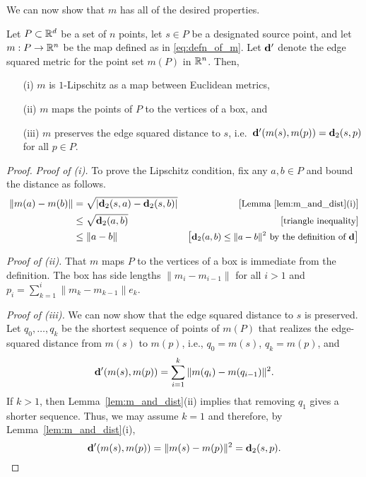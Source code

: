   We can now show that $m$ has all of the desired properties.

  \begin{prop}\label{prop:m_is_good}
    Let $P\subset\mathbb{R}^d$ be a set of $n$ points, let $s\in P$ be a designated source point, and let $m:P\to \mathbb{R}^n$ be the map defined as in \eqref{eq:defn_of_m}.
    Let $\mathbf{d}'$ denote the edge squared metric for the point set $m(P)$ in $\mathbb{R}^n$.
    Then,
    \begin{enumerate}
      \item[(i)] $m$ is $1$-Lipschitz as a map between Euclidean metrics,
      \item[(ii)] $m$ maps the points of $P$ to the vertices of a box, and
      \item[(iii)] $m$ preserves the edge squared distance to $s$, i.e.\ $\mathbf{d}'(m(s), m(p)) = \mathbf{d}_2(s,p)$ for all $p\in P$.
    \end{enumerate} 
  \end{prop}
  \begin{proof}
    \emph{Proof of (i).} To prove the Lipschitz condition, fix any $a,b\in P$ and bound the distance as follows.
    \begin{align*}
      \|m(a) - m(b)\| 
        &= \sqrt{|\mathbf{d}_2(s,a) - \mathbf{d}_2(s,b)|} &\left[\text{\small{Lemma~\ref{lem:m_and_dist}(i)}}\right]\\
        &\le \sqrt{\mathbf{d}_2(a,b)} &\left[\text{\small{triangle inequality}}\right]\\
        &\le \|a-b\| &\left[\text{\small{$\mathbf{d}_2(a,b)\le \|a-b\|^2$ by the definition of $\mathbf{d}$}}\right]
    \end{align*}

    \noindent
    \emph{Proof of (ii).} That $m$ maps $P$ to the vertices of a box is immediate from the definition.
    The box has side lengths $\|m_i - m_{i-1}\|$ for all $i>1$ and $p_i = \sum_{k=1}^i \|m_k - m_{k-1}\| e_k$.

    \noindent
    \emph{Proof of (iii).} We can now show that the edge squared distance to $s$ is preserved.
    Let $q_0,\ldots, q_k$ be the shortest sequence of points of $m(P)$ that realizes the edge-squared distance from $m(s)$ to $m(p)$, i.e., $q_0 = m(s)$, $q_k = m(p)$, and 
    \[
      \mathbf{d}'(m(s), m(p)) = \sum_{i = 1}^k \|m(q_i) - m(q_{i-1})\|^2.
    \]
    If $k> 1$, then Lemma~\ref{lem:m_and_dist}(ii) implies that removing $q_1$ gives a shorter sequence.
    Thus, we may assume $k = 1$ and therefore, by Lemma~\ref{lem:m_and_dist}(i),
    \[
      \mathbf{d}'(m(s), m(p)) = \|m(s) - m(p)\|^2 = \mathbf{d}_2(s,p).\qedhere
    \]
  \end{proof}
  

